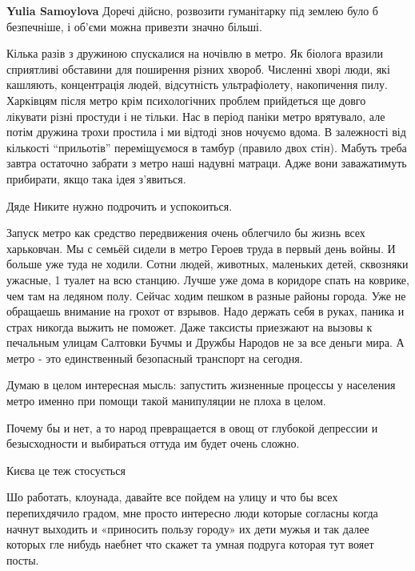 \begin{itemize}
\begin{itemize} %
\textbf{Yulia Samoylova} Доречі дійсно, розвозити гуманітарку під землею було б безпечніше, і об'єми можна привезти значно більші.
\end{itemize} %


Кілька разів з дружиною спускалися на ночівлю в метро. Як біолога вразили
сприятливі обставини для поширення різних хвороб. Численні хворі люди, які
кашляють, концентрація людей, відсутність ультрафіолету, накопичення пилу.
Харківцям після метро крім психологічних проблем прийдеться ще довго лікувати
різні простуди і не тільки. Нас в період паніки метро врятувало, але потім
дружина трохи простила і ми відтоді знов ночуємо вдома. В залежності від
кількості \enquote{прильотів} переміщуємося в тамбур (правило двох стін). Мабуть треба
завтра остаточно забрати з метро наші надувні матраци. Адже вони заважатимуть
прибирати, якщо така ідея з'явиться.

Дяде Никите нужно подрочить и успокоиться.


Запуск метро как средство передвижения очень облегчило бы жизнь всех
харьковчан. Мы с семьёй сидели в метро Героев труда в первый день войны. И
больше уже туда не ходили. Сотни людей, животных, маленьких детей, сквозняки
ужасные, 1 туалет на всю станцию. Лучше уже дома в коридоре спать на коврике,
чем там на ледяном полу. Сейчас ходим пешком в разные районы города. Уже не
обращаешь внимание на грохот от взрывов. Надо держать себя в руках, паника и
страх никогда выжить не поможет. Даже таксисты приезжают на вызовы к печальным
улицам Салтовки Бучмы и Дружбы Народов не за все деньги мира. А метро - это
единственный безопасный транспорт на сегодня.


Думаю в целом интересная мысль: запустить жизненные процессы у населения метро
именно при помощи такой манипуляции не плоха в целом.

Почему бы и нет, а то народ превращается в овощ от глубокой депрессии и
безысходности и выбираться оттуда им будет очень сложно.

Києва це теж стосується


Шо работать, клоунада, давайте все пойдем на улицу и что бы всех перепихдячило
градом, мне просто интересно люди которые согласны когда начнут выходить и
«приносить пользу городу» их дети мужья и так далее которых гле нибудь наебнет
что скажет та умная подруга которая тут вояет посты.


\end{itemize}
